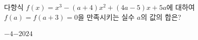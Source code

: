 다항식 $f(x)=x^3-(a+4)x^2+(4a-5)x+5a$에 대하여 $f(a)=f(a+3)=0$을 만족시키는 실수 $a$의 값의 합은?
\begin{choices32}{$-4$}{$-2$}{$0$}{$2$}{$4$}\end{choices32}
